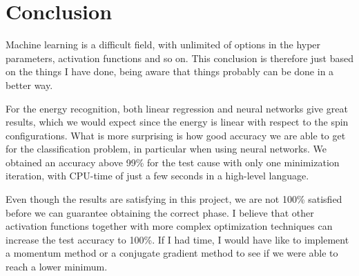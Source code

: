 \section{Conclusion} \label{sec:conclusion}
Machine learning is a difficult field, with unlimited of options in the hyper parameters, activation functions and so on. This conclusion is therefore just based on the things I have done, being aware that things probably can be done in a better way.

For the energy recognition, both linear regression and neural networks give great results, which we would expect since the energy is linear with respect to the spin configurations. What is more surprising is how good accuracy we are able to get for the classification problem, in particular when using neural networks. We obtained an accuracy above 99\% for the test cause with only one minimization iteration, with CPU-time of just a few seconds in a high-level language.

Even though the results are satisfying in this project, we are not 100\% satisfied before we can guarantee obtaining the correct phase. I believe that other activation functions together with more complex optimization techniques can increase the test accuracy to 100\%. If I had time, I would have like to implement a momentum method or a conjugate gradient method to see if we were able to reach a lower minimum. 